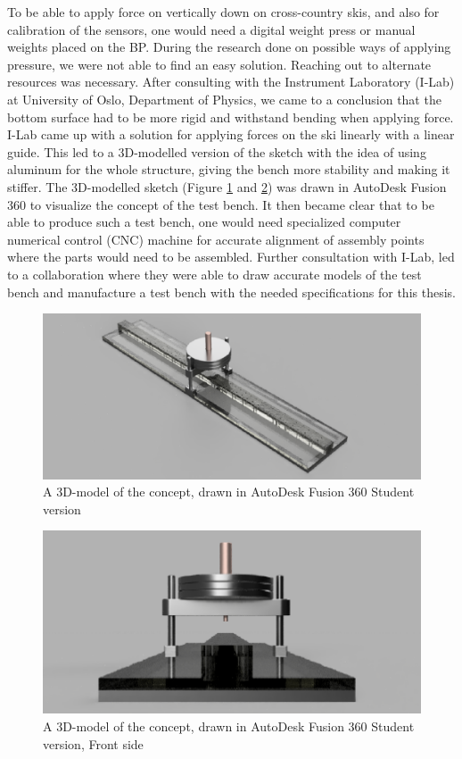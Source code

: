 To be able to apply force on vertically down on cross-country skis, and also for calibration of the sensors, one would need a digital weight press or manual weights placed on the BP. During the research done on possible ways of applying pressure, we were not able to find an easy solution. Reaching out to alternate resources was necessary.
After consulting with the Instrument Laboratory (I-Lab) at University of Oslo, Department of Physics, we came to a conclusion that the bottom surface had to be more rigid and withstand bending when applying force. I-Lab came up with a solution for applying forces on the ski linearly with a linear guide. This led to a 3D-modelled version of the sketch with the idea of using aluminum for the whole structure, giving the bench more stability and making it stiffer. The 3D-modelled sketch (Figure \ref{fig:3d-modelledsketch} and \ref{fig:3d-modelledsketch_front}) was drawn in AutoDesk Fusion 360 to visualize the concept of the test bench. It then became clear that to be able to produce such a test bench, one would need specialized computer numerical control (CNC) machine for accurate alignment of assembly points where the parts would need to be assembled. Further consultation with I-Lab, led to a collaboration where they were able to draw accurate models of the test bench and manufacture a test bench with the needed specifications for this thesis.
\begin{figure}
    \centering
    \includegraphics[scale=0.406]{figures/3dmodelledconcept.png}
    \caption{A 3D-model of the concept, drawn in AutoDesk Fusion 360 Student version}
    \label{fig:3d-modelledsketch}
\end{figure}
\begin{figure}
    \centering
    \includegraphics[scale=0.406]{figures/3dmodelledconcept_front.png}
    \caption{A 3D-model of the concept, drawn in AutoDesk Fusion 360 Student version, Front side}
    \label{fig:3d-modelledsketch_front}
\end{figure}
